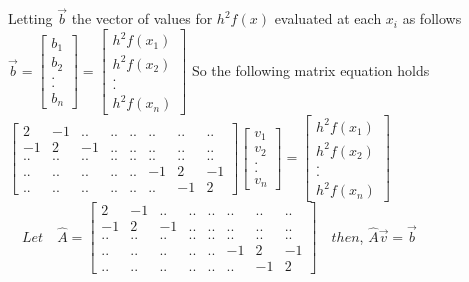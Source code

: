 \documentclass[11pt, oneside]{article}   	%
\begin{document}
\newline
Letting $\vec{b}$ the vector of values for $h^2f(x)$ evaluated at each $x_i$ as follows\newline
\newline
$\vec{b}=  \begin{bmatrix}
b_1\\
b_2\\
.\\
.\\
b_n
\end{bmatrix}  =   \begin{bmatrix}
h^2f(x_1)\\
h^2f(x_2)\\
.\\
.\\
h^2f(x_n)
\end{bmatrix}$\newline
\newline
So the following matrix equation holds
\newline
\newline
$\begin{bmatrix}
2 & -1 & ..& ..& ..& ..& ..& ..\\
-1 & 2 & -1 & .. & ..& ..& ..& ..\\
.. & .. & ..& ..& ..& ..& ..& ..\\
.. & .. & .. & .. & .. & -1 & 2 & -1\\
.. & .. & .. & .. & .. & .. & -1 & 2
\end{bmatrix}  \begin{bmatrix}
v_1\\
v_2\\
.\\
.\\
v_n
\end{bmatrix} =  \begin{bmatrix}
h^2f(x_1)\\
h^2f(x_2)\\
.\\
.\\
h^2f(x_n)
\end{bmatrix}$\newline
\newline\newline
$\quad Let \quad \hat{A} = \begin{bmatrix}
2 & -1 & ..& ..& ..& ..& ..& ..\\
-1 & 2 & -1 & .. & ..& ..& ..& ..\\
.. & .. & ..& ..& ..& ..& ..& ..\\
.. & .. & .. & .. & .. & -1 & 2 & -1\\
.. & .. & .. & .. & .. & .. & -1 & 2
\end{bmatrix}\quad then$,\newline
\newline
$ \hat{A}\vec{v} = \vec{b}$\newline
\newline
\end{document}
